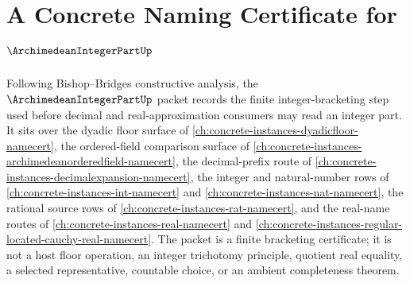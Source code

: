 \chapter{A Concrete Naming Certificate for $\ArchimedeanIntegerPartUp$}
\label{ch:concrete-instances-archimedean-integer-part-namecert}

Following Bishop--Bridges constructive analysis, the $\ArchimedeanIntegerPartUp$ packet records the finite integer-bracketing step used before decimal and real-approximation consumers may read an integer part. It sits over the dyadic floor surface of \autoref{ch:concrete-instances-dyadicfloor-namecert}, the ordered-field comparison surface of \autoref{ch:concrete-instances-archimedeanorderedfield-namecert}, the decimal-prefix route of \autoref{ch:concrete-instances-decimalexpansion-namecert}, the integer and natural-number rows of \autoref{ch:concrete-instances-int-namecert} and \autoref{ch:concrete-instances-nat-namecert}, the rational source rows of \autoref{ch:concrete-instances-rat-namecert}, and the real-name routes of \autoref{ch:concrete-instances-real-namecert} and \autoref{ch:concrete-instances-regular-located-cauchy-real-namecert}. The packet is a finite bracketing certificate; it is not a host floor operation, an integer trichotomy principle, quotient real equality, a selected representative, countable choice, or an ambient completeness theorem.

